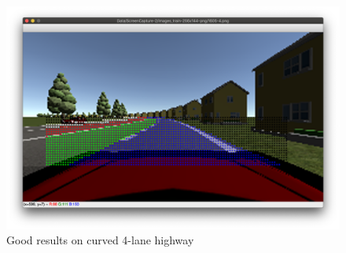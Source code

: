 \begin{figure}[H]
  \centering
  \includegraphics[scale=0.31]{images/Chapter5/lane4-curve-green.png}
  \caption{Good results on curved 4-lane highway}
  \label{fig:good-curve-4}
\end{figure}

